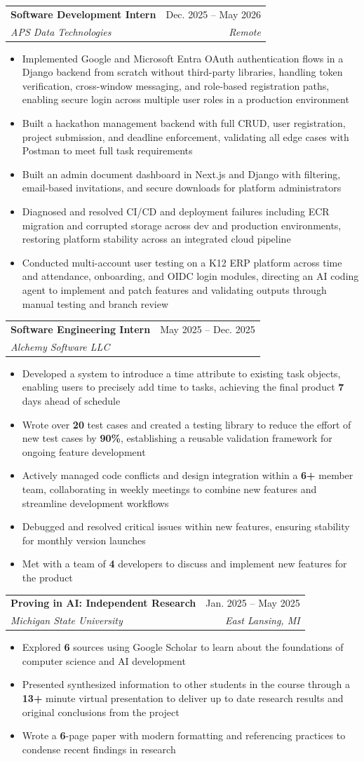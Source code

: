 \documentclass[letterpaper,11pt]{article}
\makeatletter
\newcommand{\resumeItem}[1]{
  \item\small{
    {#1 \vspace{-4pt}}
  }
}
\newcommand{\resumeSubheading}[4]{
  \vspace{-2pt}\item
    \begin{tabular*}{0.97\textwidth}[t]{l@{\extracolsep{\fill}}r}
      \textbf{#1} & #2 \\
      \textit{\small#3} & \textit{\small #4} \\
    \end{tabular*}\vspace{-7pt}
}
\newcommand{\resumeItemListStart}{\begin{itemize}}
\newcommand{\resumeItemListEnd}{\end{itemize}\vspace{-5pt}}
\makeatother
\begin{document}
    \resumeSubheading
      {Software Development Intern}{Dec. 2025 -- May 2026}
      {APS Data Technologies}{Remote}
      \resumeItemListStart
        \resumeItem{Implemented Google and Microsoft Entra OAuth authentication flows in a Django backend from scratch without third-party libraries, handling token verification, cross-window messaging, and role-based registration paths, enabling secure login across multiple user roles in a production environment}
        \resumeItem{Built a hackathon management backend with full CRUD, user registration, project submission, and deadline enforcement, validating all edge cases with Postman to meet full task requirements}
        \resumeItem{Built an admin document dashboard in Next.js and Django with filtering, email-based invitations, and secure downloads for platform administrators}
        \resumeItem{Diagnosed and resolved CI/CD and deployment failures including ECR migration and corrupted storage across dev and production environments, restoring platform stability across an integrated cloud pipeline}
        \resumeItem{Conducted multi-account user testing on a K12 ERP platform across time and attendance, onboarding, and OIDC login modules, directing an AI coding agent to implement and patch features and validating outputs through manual testing and branch review}
      \resumeItemListEnd

    \resumeSubheading
      {Software Engineering Intern}{May 2025 -- Dec. 2025}
      {Alchemy Software LLC}{}
      \resumeItemListStart
        \resumeItem{Developed a system to introduce a time attribute to existing task objects, enabling users to precisely add time to tasks, achieving the final product \textbf{7} days ahead of schedule}
        \resumeItem{Wrote over \textbf{20} test cases and created a testing library to reduce the effort of new test cases by \textbf{90\%}, establishing a reusable validation framework for ongoing feature development}
        \resumeItem{Actively managed code conflicts and design integration within a \textbf{6+} member team, collaborating in weekly meetings to combine new features and streamline development workflows}
        \resumeItem{Debugged and resolved critical issues within new features, ensuring stability for monthly version launches}
        \resumeItem{Met with a team of \textbf{4} developers to discuss and implement new features for the product}
      \resumeItemListEnd

    \resumeSubheading
      {Proving in AI: Independent Research}{Jan. 2025 -- May 2025}
      {Michigan State University}{East Lansing, MI}
      \resumeItemListStart
        \resumeItem{Explored \textbf{6} sources using Google Scholar to learn about the foundations of computer science and AI development}
        \resumeItem{Presented synthesized information to other students in the course through a \textbf{13+} minute virtual presentation to deliver up to date research results and original conclusions from the project}
        \resumeItem{Wrote a \textbf{6}-page paper with modern formatting and referencing practices to condense recent findings in research}
      \resumeItemListEnd
\end{document}
